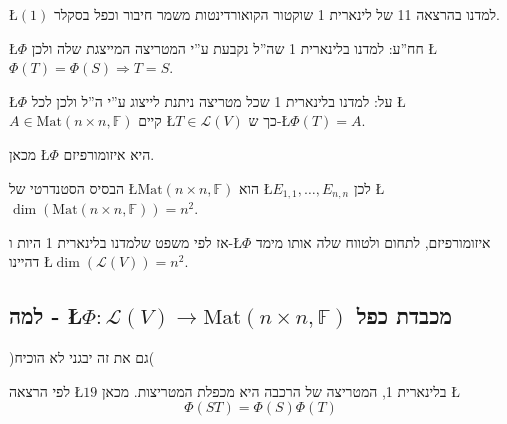 \documentclass[english,hebrew]{article}
\begin{document}
\L{$(1)$} למדנו בהרצאה 11 של לינארית 1 שוקטור הקואורדינטות משמר חיבור
וכפל בסקלר.

\L{$\Phi$} חח\textquotedblright ע: למדנו בלינארית 1 שה\textquotedblright ל
נקבעת ע\textquotedblright י המטריצה המייצגת שלה ולכן \L{$\Phi(T)=\Phi(S)\Rightarrow T=S$}.

\L{$\Phi$} על: למדנו בלינארית 1 שכל מטריצה ניתנת לייצוג ע\textquotedblright י
ה\textquotedblright ל ולכן לכל \L{$A\in\text{Mat}\left(n\times n,\mathbb{F}\right)$}
קיים \L{$T\in\mathcal{L}(V)$} כך ש-\L{$\Phi(T)=A$}.

מכאן \L{$\Phi$} היא איזומורפיזם.

הבסיס הסטנדרטי של \L{$\text{Mat}\left(n\times n,\mathbb{F}\right)$}
הוא \L{$E_{1,1},\dots,E_{n,n}$} לכן \L{$\dim\left(\text{Mat}\left(n\times n,\mathbb{F}\right)\right)=n^{2}$}.

אז לפי משפט שלמדנו בלינארית 1 היות ו-\L{$\Phi$} איזומורפיזם, לתחום
ולטווח שלה אותו מימד דהיינו \L{$\dim\left(\mathcal{L}\left(V\right)\right)=n^{2}$}.

\subsection{למה - \L{$\Phi:\mathcal{L}(V)\rightarrow\text{Mat}\left(n\times n,\mathbb{F}\right)$}
מכבדת כפל}

)גם את זה יבגני לא הוכיח(

לפי הרצאה \L{$19$} בלינארית 1, המטריצה של הרכבה היא מכפלת המטריצות.
מכאן \L{%
\[
\Phi\left(ST\right)=\Phi(S)\Phi(T)
\]
}%
\end{document}

